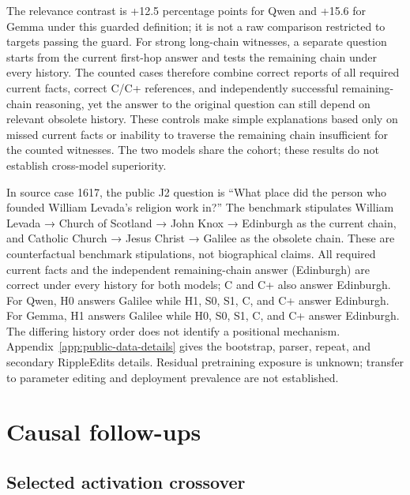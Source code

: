 \documentclass{article}
\begin{document}
The relevance contrast is +12.5 percentage points for Qwen and +15.6 for Gemma under this guarded definition; it is not a raw comparison restricted to targets passing the guard. For strong long-chain witnesses, a separate question starts from the current first-hop answer and tests the remaining chain under every history. The counted cases therefore combine correct reports of all required current facts, correct C/C+ references, and independently successful remaining-chain reasoning, yet the answer to the original question can still depend on relevant obsolete history. These controls make simple explanations based only on missed current facts or inability to traverse the remaining chain insufficient for the counted witnesses. The two models share the cohort; these results do not establish cross-model superiority.

In source case 1617, the public J2 question is “What place did the person who founded William Levada's religion work in?” The benchmark stipulates William Levada → Church of Scotland → John Knox → Edinburgh as the current chain, and Catholic Church → Jesus Christ → Galilee as the obsolete chain. These are counterfactual benchmark stipulations, not biographical claims. All required current facts and the independent remaining-chain answer (Edinburgh) are correct under every history for both models; C and C+ also answer Edinburgh. For Qwen, H0 answers Galilee while H1, S0, S1, C, and C+ answer Edinburgh. For Gemma, H1 answers Galilee while H0, S0, S1, C, and C+ answer Edinburgh. The differing history order does not identify a positional mechanism. Appendix~\ref{app:public-data-details} gives the bootstrap, parser, repeat, and secondary RippleEdits details. Residual pretraining exposure is unknown; transfer to parameter editing and deployment prevalence are not established.
\FloatBarrier

\section{Causal follow-ups}
\label{sec:causal-followups}

\subsection{Selected activation crossover}
\end{document}
